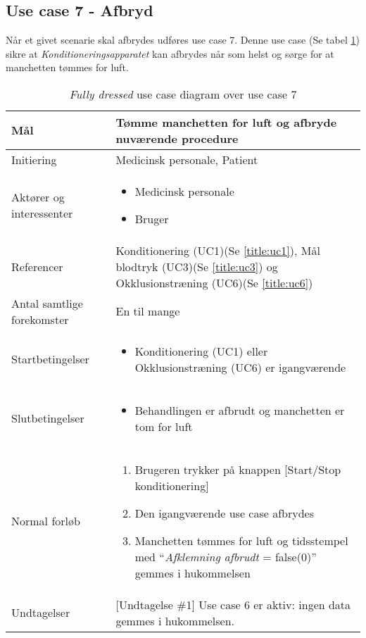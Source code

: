 	\subsection{Use case 7 - Afbryd}
	Når et givet scenarie skal afbrydes udføres use case 7. Denne use case (Se tabel \ref{tab:uc7}) sikre at \textit{Konditioneringsapparatet} kan afbrydes når som helst og sørge for at manchetten tømmes for luft. 
	\begin{table}[H]
			\begin{center}
			\begin{tabular}{ | p{} | p{}| } 
				\hline
				Mål & Tømme manchetten for luft og afbryde nuværende procedure \\ 
				\hline
				Initiering &  Medicinsk personale, Patient\\
				\hline
				Aktører og interessenter & 
				\begin{itemize}
					\item Medicinsk personale 
					\item Bruger 
				\end{itemize} \\ 
				\hline
				Referencer & Konditionering (UC1)(Se \ref{title:uc1}), Mål blodtryk (UC3)(Se \ref{title:uc3}) og Okklusionstræning (UC6)(Se \ref{title:uc6}) \\ 
				\hline
				Antal samtlige forekomster & En til mange \\ 
				\hline	
				Startbetingelser & 
				\begin{itemize}
					\item Konditionering (UC1) eller Okklusionstræning (UC6) er igangværende				\end{itemize} \\ 
				\hline
				Slutbetingelser & 
				\begin{itemize}
					\item Behandlingen er afbrudt og manchetten er tom for luft
				\end{itemize} \\ 
				\hline
				Normal forløb & \begin{enumerate}
					\setlength\itemsep{0cm} %
					\item Brugeren trykker på knappen [Start/Stop konditionering]
					\item Den igangværende use case afbrydes
					\item Manchetten tømmes for luft og tidsstempel med “\textit{Afklemning afbrudt} = false(0)” gemmes i hukommelsen
					\subitem[Undtagelse \#1]
				\end{enumerate} \\ 
				\hline
				Undtagelser & [Undtagelse \#1] Use case 6 er aktiv: ingen data gemmes i hukommelsen. \\ 
				\hline
			\end{tabular}
		\end{center}
			\caption{\textit{Fully dressed} use case diagram over use case 7} \label{tab:uc7}
		\end{table}
	\newpage

		